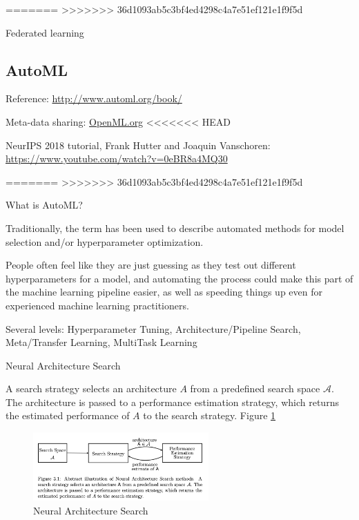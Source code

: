 \documentclass[english]{article}
\begin{document}
=======
>>>>>>> 36d1093ab5c3bf4ed4298c4a7e51ef121e1f9f5d
\item Federated learning



\eenum 



\subsection{AutoML}


\benum 

\item Reference: \url{http://www.automl.org/book/}

Meta-data sharing: \url{OpenML.org}
<<<<<<< HEAD

NeurIPS 2018 tutorial, Frank Hutter and Joaquin Vanschoren: \url{https://www.youtube.com/watch?v=0eBR8a4MQ30}

=======
>>>>>>> 36d1093ab5c3bf4ed4298c4a7e51ef121e1f9f5d

\item What is AutoML?

Traditionally, the term has been used to describe automated methods for model selection and/or hyperparameter optimization.

People often feel like they are just guessing as they test out different hyperparameters for a model, and automating the process could make this part of the machine learning pipeline easier, as well as speeding things up even for experienced machine learning practitioners.

\item Several levels: Hyperparameter Tuning, Architecture/Pipeline Search, Meta/Transfer Learning, MultiTask Learning

\item Neural Architecture Search

\benum 
\item A search strategy selects an architecture $A$ from a predefined search space $\mathcal{A}$. The architecture is passed to a performance estimation strategy, which returns the estimated performance of $A$ to the search strategy. Figure \ref{nas} 

\begin{figure}[h!]
  \centering
  \includegraphics[width=0.6\textwidth]{nas.png}
  \caption{Neural Architecture Search}
  \label{nas}
\end{figure}
\end{document}
